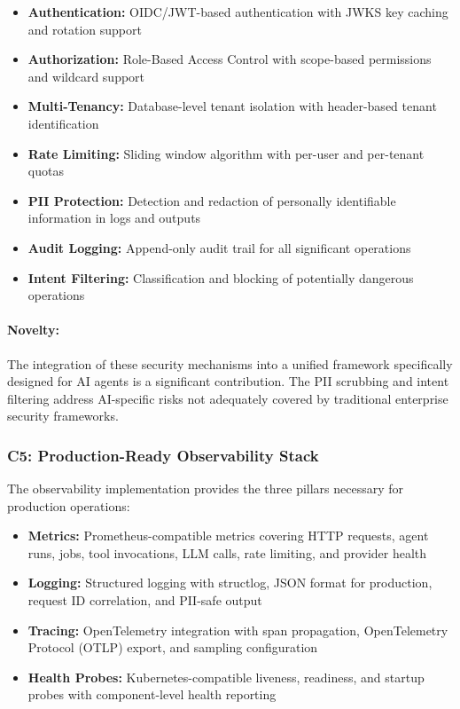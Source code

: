 \documentclass[a4paper,twoside]{sapthesis}
\begin{document}
\begin{itemize}
    \item \textbf{Authentication:} OIDC/JWT-based authentication with JWKS key caching and rotation support
    \item \textbf{Authorization:} Role-Based Access Control with scope-based permissions and wildcard support
    \item \textbf{Multi-Tenancy:} Database-level tenant isolation with header-based tenant identification
    \item \textbf{Rate Limiting:} Sliding window algorithm with per-user and per-tenant quotas
    \item \textbf{PII Protection:} Detection and redaction of personally identifiable information in logs and outputs
    \item \textbf{Audit Logging:} Append-only audit trail for all significant operations
    \item \textbf{Intent Filtering:} Classification and blocking of potentially dangerous operations
\end{itemize}

\paragraph{Novelty:} The integration of these security mechanisms into a unified framework specifically designed for AI agents is a significant contribution. The PII scrubbing and intent filtering address AI-specific risks not adequately covered by traditional enterprise security frameworks.

\subsubsection{C5: Production-Ready Observability Stack}

The observability implementation provides the three pillars necessary for production operations:

\begin{itemize}
    \item \textbf{Metrics:} Prometheus-compatible metrics covering HTTP requests, agent runs, jobs, tool invocations, LLM calls, rate limiting, and provider health
    \item \textbf{Logging:} Structured logging with structlog, JSON format for production, request ID correlation, and PII-safe output
    \item \textbf{Tracing:} OpenTelemetry integration with span propagation, OpenTelemetry Protocol (OTLP) export, and sampling configuration
    \item \textbf{Health Probes:} Kubernetes-compatible liveness, readiness, and startup probes with component-level health reporting
\end{itemize}
\end{document}
